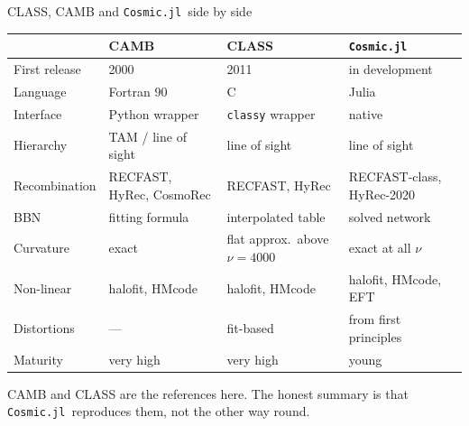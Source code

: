 \documentclass[10pt,aspectratio=43]{beamer}
\newcommand{\Cosmic}{\textcolor{cdeep}{\texttt{Cosmic.jl}}}
\begin{document}
\begin{frame}{CLASS, CAMB and \Cosmic\ side by side}
  \renewcommand{\arraystretch}{1.15}
  \begin{center}\scriptsize
  \begin{tabular}{@{}llll@{}}
    \toprule
     & \textbf{CAMB} & \textbf{CLASS} & \Cosmic \\
    \midrule
    First release   & 2000 & 2011 & in development \\
    Language        & Fortran 90 & C & Julia \\
    Interface       & Python wrapper & \texttt{classy} wrapper & native \\
    Hierarchy       & TAM / line of sight & line of sight & line of sight \\
    Recombination   & RECFAST, HyRec, CosmoRec & RECFAST, HyRec & RECFAST-class, HyRec-2020 \\
    BBN             & fitting formula & interpolated table & solved network \\
    Curvature       & exact & flat approx.\ above $\nu=4000$ & exact at all $\nu$ \\
    Non-linear      & halofit, HMcode & halofit, HMcode & halofit, HMcode, EFT \\
    Distortions     & --- & fit-based & from first principles \\
    Maturity        & \textcolor{cdeep}{very high} & \textcolor{cdeep}{very high} & \alert{young} \\
    \bottomrule
  \end{tabular}
  \end{center}
  \vfill
  \footnotesize CAMB and CLASS are the references here. The honest summary is
  that \Cosmic\ reproduces them, not the other way round.
\end{frame}
\end{document}

